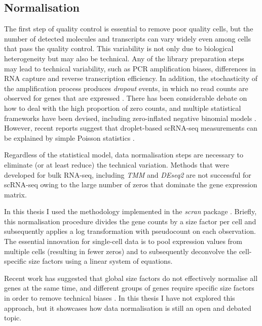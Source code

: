 \subsection{Normalisation}

The first step of quality control is essential to remove poor quality cells, but the number of detected molecules and transcripts can vary widely even among cells that pass the quality control. This variability is not only due to biological heterogeneity but may also be technical. Any of the library preparation steps may lead to technical variability, such as PCR amplification biases, differences in RNA capture and reverse transcription efficiency. In addition, the stochasticity of the amplification process produces \textit{dropout} events, in which no read counts are observed for genes that are expressed \cite{VandenBerge2018}. There has been considerable debate on how to deal with the high proportion of zero counts, and multiple statistical frameworks have been devised, including zero-inflated negative binomial models \cite{Risso2018}. However, recent reports suggest that droplet-based scRNA-seq measurements can be explained by simple Poisson statistics \cite{Svensson2020,Sarkar2020}.

Regardless of the statistical model, data normalisation steps are necessary to eliminate (or at least reduce) the technical variation. Methods that were developed for bulk RNA-seq, including \textit{TMM} \cite{Robinson2010} and \textit{DEseq2} \cite{Love2014} are not successful for scRNA-seq owing to the large number of zeros that dominate the gene expression matrix.

In this thesis I used the methodology implemented in the \textit{scran} package \cite{Lun2016a}. Briefly, this normalisation procedure divides the gene counts by a size factor per cell and subsequently applies a log transformation with pseudocount on each observation. The essential innovation for single-cell data is to pool expression values from multiple cells (resulting in fewer zeros) and to subsequently deconvolve the cell-specific size factors using a linear system of equations.

Recent work has suggested that global size factors do not effectively normalise all genes at the same time, and different groups of genes require specific size factors in order to remove technical biases \cite{Hafemeister2019}. In this thesis I have not explored this approach, but it showcases how data normalisation is still an open and debated topic.

